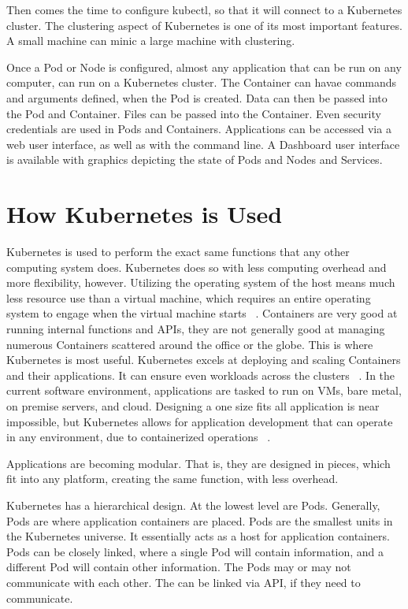 Then comes the time to configure kubectl, so that it will connect to a
Kubernetes cluster.  The clustering aspect of Kubernetes is one of its
most important features.  A small machine can minic a large machine
with clustering\cite{kubectl}.  

Once a Pod or Node is configured, almost any application that can be
run on any computer, can run on a Kubernetes cluster.  The Container
can havae commands and arguments defined, when the Pod is created.
Data can then be passed into the Pod and Container.  Files can be
passed into the Container.  Even security credentials are used in Pods
and Containers.  Applications can be accessed via a web user
interface, as well as with the command line.  A Dashboard user
interface is available with graphics depicting the state of Pods and
Nodes and Services\cite{dash}.


\section{How Kubernetes is Used}

Kubernetes is used to perform the exact same functions that any other
computing system does.  Kubernetes does so with less computing
overhead and more flexibility, however\cite{dash}.  Utilizing the
operating system of the host means much less resource use than a
virtual machine, which requires an entire operating system to engage
when the virtual machine starts ~\cite{reasons}.  Containers are very
good at running internal functions and APIs, they are not generally
good at managing numerous Containers scattered around the office or
the globe.  This is where Kubernetes is most useful.  Kubernetes
excels at deploying and scaling Containers and their applications.  It
can ensure even workloads across the clusters ~\cite{reasons}.  In the
current software environment, applications are tasked to run on VMs,
bare metal, on premise servers, and cloud.  Designing a one size fits
all application is near impossible, but Kubernetes allows for
application development that can operate in any environment, due to
containerized operations ~\cite{reasons}.  

Applications are becoming modular.  That is, they are designed in
pieces, which fit into any platform, creating the same function, with
less overhead.  

Kubernetes has a hierarchical design.  At the lowest level are Pods.
Generally, Pods are where application containers are placed.  Pods are
the smallest units in the Kubernetes universe.  It essentially acts as
a host for application containers.  Pods can be closely linked, where
a single Pod will contain information, and a different Pod will
contain other information.  The Pods may or may not communicate with
each other.  The can be linked via API, if they need to
communicate.   

